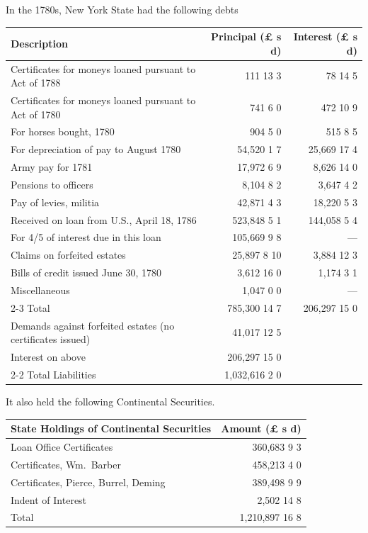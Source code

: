 \documentclass[11pt]{article}
\newcommand{\STRUT}{\rule{0in}{3ex}}
\begin{document}
In the 1780s, New York State had the following debts
\begin{center}
\begin{tabular}{lrr}
Description & Principal (£ s d) & Interest (£ s d) \\
\hline
Certificates for moneys loaned pursuant to Act of 1788 & 111 13 3    & 78 14 5 \STRUT\\
Certificates for moneys loaned pursuant to Act of 1780 & 741 6 0     & 472 10 9 \\
For horses bought, 1780                                & 904 5 0     & 515 8 5 \\
For depreciation of pay to August 1780                 & 54,520 1 7  & 25,669 17 4 \\
Army pay for 1781                                      & 17,972 6 9  & 8,626 14 0 \\
Pensions to officers                                   & 8,104 8 2   & 3,647 4 2 \\
Pay of levies, militia                                 & 42,871 4 3  & 18,220 5 3 \\
Received on loan from U.S., April 18, 1786             & 523,848 5 1 & 144,058 5 4 \\
For 4/5 of interest due in this loan                   & 105,669 9 8 & --- \\
Claims on forfeited estates                            & 25,897 8 10 & 3,884 12 3 \\
Bills of credit issued June 30, 1780                   & 3,612 16 0  & 1,174 3 1 \\
Miscellaneous                                          & 1,047 0 0   & --- \\
\cline{2-3}
Total                                                  & 785,300 14 7 & 206,297 15 0 \STRUT \\

Demands against forfeited estates (no certificates issued) & 41,017 12 5 & \STRUT \\
Interest on above & 206,297 15 0 & \\
\cline{2-2}
Total Liabilities & 1,032,616 2 0 & \STRUT
\end{tabular}
\end{center}

\noindent It also held the following Continental Securities.
\begin{center}
\begin{tabular}{lr}
State Holdings of Continental Securities & Amount (£ s d) \\
\hline
Loan Office Certificates             & 360,683 9 3\STRUT\\
Certificates, Wm.\ Barber            & 458,213 4 0\\
Certificates, Pierce, Burrel, Deming & 389,498 9 9\\
Indent of Interest  & 2,502 14 8 \\
\hline
Total & 1,210,897 16 8\STRUT
\end{tabular}
\end{center}
\end{document}
